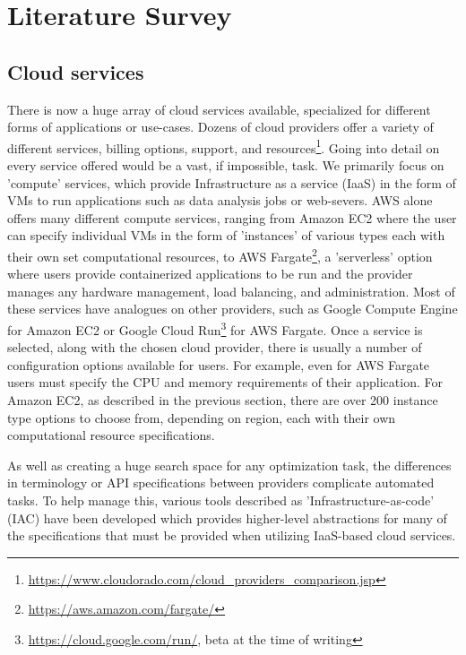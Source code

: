 \documentclass{report}
\begin{document}
\chapter{Literature Survey}
\section{Cloud services}
There is now a huge array of cloud services available, specialized for different forms of applications or use-cases. Dozens of cloud providers offer a variety of different services, billing options, support, and resources\footnote{\url{https://www.cloudorado.com/cloud_providers_comparison.jsp}}. Going into detail on every service offered would be a vast, if impossible, task. We primarily focus on 'compute' services, which provide Infrastructure as a service (IaaS) in the form of VMs to run applications such as data analysis jobs or web-severs. AWS alone offers many different compute services, ranging from Amazon EC2 where the user can specify individual VMs in the form of 'instances' of various types each with their own set computational resources, to AWS Fargate\footnote{\url{https://aws.amazon.com/fargate/}}, a 'serverless' option where users provide containerized applications to be run and the provider manages any hardware management, load balancing, and administration. Most of these services have analogues on other providers, such as Google Compute Engine for Amazon EC2 or Google Cloud Run\footnote{\url{https://cloud.google.com/run/}, beta at the time of writing} for AWS Fargate. Once a service is selected, along with the chosen cloud provider, there is usually a number of configuration options available for users. For example, even for AWS Fargate users must specify the CPU and memory requirements of their application. For Amazon EC2, as described in the previous section, there are over 200 instance type options to choose from, depending on region, each with their own computational resource specifications.

As well as creating a huge search space for any optimization task, the differences in terminology or API specifications between providers complicate automated tasks. To help manage this, various tools described as 'Infrastructure-as-code' (IAC) have been developed which provides higher-level abstractions for many of the specifications that must be provided when utilizing IaaS-based cloud services. 
\end{document}
